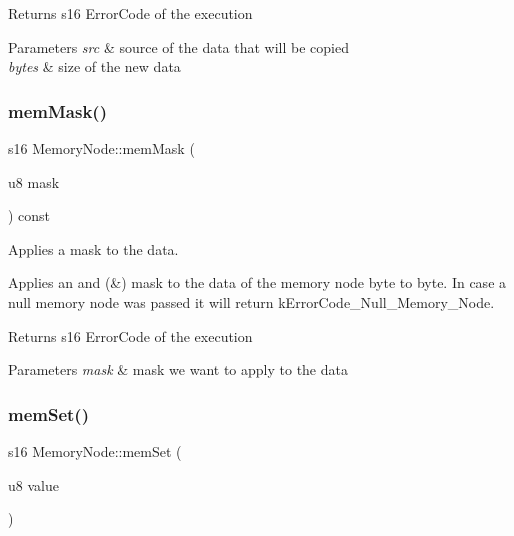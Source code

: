 \begin{DoxyReturn}{Returns}
s16 Error\+Code of the execution 
\end{DoxyReturn}

\begin{DoxyParams}{Parameters}
{\em src} & source of the data that will be copied \\
\hline
{\em bytes} & size of the new data \\
\hline
\end{DoxyParams}
\mbox{\label{class_memory_node_a5a9f89d13c46a4fcca917d7313b1e1d6}} 
\subsubsection{\texorpdfstring{mem\+Mask()}{memMask()}}
{\footnotesize\ttfamily s16 Memory\+Node\+::mem\+Mask (\begin{DoxyParamCaption}\item[{u8}]{mask }\end{DoxyParamCaption}) const}



Applies a mask to the data. 

Applies an and (\&) mask to the data of the memory node byte to byte. In case a null memory node was passed it will return k\+Error\+Code\+\_\+\+Null\+\_\+\+Memory\+\_\+\+Node. \begin{DoxyReturn}{Returns}
s16 Error\+Code of the execution 
\end{DoxyReturn}

\begin{DoxyParams}{Parameters}
{\em mask} & mask we want to apply to the data \\
\hline
\end{DoxyParams}
\mbox{\label{class_memory_node_a0d366149c6c235c72016ba5bf2b7fe3c}} 
\subsubsection{\texorpdfstring{mem\+Set()}{memSet()}}
{\footnotesize\ttfamily s16 Memory\+Node\+::mem\+Set (\begin{DoxyParamCaption}\item[{u8}]{value }\end{DoxyParamCaption})}



